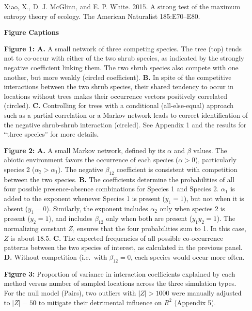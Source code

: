 \documentclass[12pt,]{article}
\begin{document}
\begin{spacing}{1.9}
\begin{flushleft}
Xiao, X., D. J. McGlinn, and E. P. White. 2015. A strong test of the
maximum entropy theory of ecology. The American Naturalist 185:E70--E80.

\setlength{\parindent}{0em} \setlength{\leftskip}{0em}

\textbf{Figure Captions}

\textbf{Figure 1: A.} A small network of three competing species. The
tree (top) tends not to co-occur with either of the two shrub species,
as indicated by the strongly negative coefficient linking them. The two
shrub species also compete with one another, but more weakly (circled
coefficient). \textbf{B.} In spite of the competitive interactions
between the two shrub species, their shared tendency to occur in
locations without trees makes their occurrence vectors positively
correlated (circled). \textbf{C.} Controlling for trees with a
conditional (all-else-equal) approach such as a partial correlation or a
Markov network leads to correct identification of the negative
shrub-shrub interaction (circled). See Appendix 1 and the results for
``three species'' for more details.

\textbf{Figure 2: A.} A small Markov network, defined by its \(\alpha\)
and \(\beta\) values. The abiotic environment favors the occurrence of
each species (\(\alpha >0\)), particularly species 2
(\(\alpha_2 > \alpha_1\)). The negative \(\beta_{12}\) coefficient is
consistent with competition between the two species. \textbf{B.} The
coefficients determine the probabilities of all four possible
presence-absence combinations for Species 1 and Species 2. \(\alpha_1\)
is added to the exponent whenever Species 1 is present (\(y_1 = 1\)),
but not when it is absent (\(y_1 = 0\)). Similarly, the exponent
includes \(\alpha_2\) only when species \(2\) is present (\(y_2 = 1\)),
and includes \(\beta_{12}\) only when both are present (\(y_1y_2 = 1\)).
The normalizing constant \(Z\), ensures that the four probabilities sum
to 1. In this case, \(Z\) is about 18.5. \textbf{C.} The expected
frequencies of all possible co-occurrence patterns between the two
species of interest, as calculated in the previous panel. \textbf{D.}
Without competition (i.e.~with \(\beta_{12}=0\), each species would
occur more often.

\textbf{Figure 3:} Proportion of variance in interaction coefficients
explained by each method versus number of sampled locations across the
three simulation types. For the null model (Pairs), two outliers with
\(|Z|>1000\) were manually adjusted to \(|Z|=50\) to mitigate their
detrimental influence on \(R^2\) (Appendix 5).


\end{flushleft}
\end{spacing}
\end{document}
